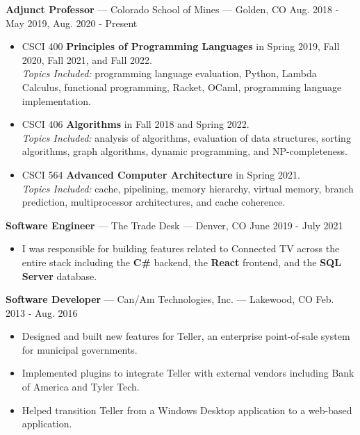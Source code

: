 \documentclass[10pt,letterpaper]{article}
\begin{document}
\textbf{Adjunct Professor} --- Colorado School of Mines --- Golden, CO
\hfill Aug. 2018 - May 2019, Aug. 2020 - Present
\begin{itemize}
    \item CSCI 400 \textbf{Principles of Programming Languages} in Spring
        2019, Fall 2020, Fall 2021, and Fall 2022. \\
        \textit{Topics Included:} programming language evaluation, Python,
        Lambda Calculus, functional programming, Racket, OCaml, programming
        language implementation.
    \item CSCI 406 \textbf{Algorithms} in Fall 2018 and Spring 2022. \\
        \textit{Topics Included:} analysis of algorithms, evaluation of data
        structures, sorting algorithms, graph algorithms, dynamic programming,
        and NP-completeness.
    \item CSCI 564 \textbf{Advanced Computer Architecture} in Spring
        2021. \\
        \textit{Topics Included:} cache, pipelining, memory hierarchy, virtual
        memory, branch prediction, multiprocessor architectures, and cache
        coherence.
\end{itemize}

\textbf{Software Engineer} --- The Trade Desk --- Denver, CO
\hfill June 2019 - July 2021
\begin{itemize}
    \item I was responsible for building features related to Connected TV across
        the entire stack including the \textbf{C\#} backend, the \textbf{React}
        frontend, and the \textbf{SQL Server} database.
\end{itemize}




\vspace{2pt}
\textbf{Software Developer} --- Can/Am Technologies, Inc. --- Lakewood, CO
\hfill Feb. 2013 - Aug. 2016
\begin{itemize}
    \item Designed and built new features for Teller, an enterprise
        point-of-sale system for municipal governments.
    \item Implemented plugins to integrate Teller with external vendors
        including Bank of America and Tyler Tech.
    \item Helped transition Teller from a Windows Desktop application to a
        web-based application.
\end{itemize}
\end{document}
